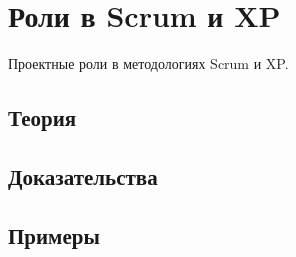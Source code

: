 
\section{Роли в Scrum и XP}
\label{sec:2.6.07-scrum-xp-roles}

\begin{ticket}
Проектные роли в методологиях Scrum и XP.
\end{ticket}

\subsection*{Теория}

\subsection*{Доказательства}

\subsection*{Примеры}
